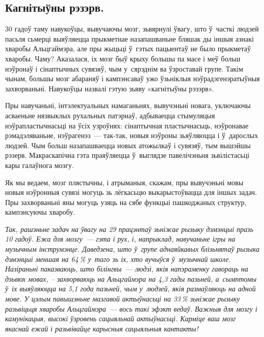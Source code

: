 \subsection*{Кагнітыўны рэзэрв.}

30 гадоў таму навукоўцы, вывучаючы мозг, зьвярнулі ўвагу, што ў~часткі людзей пасьля сьмерці выяўляецца прыкметнае назапашваньне бляшак ды іншыя азнакі хваробы Альцгаймэра, але пры жыцьці ў~гэтых пацыентаў не было прыкметаў хваробы. Чаму? Аказалася, іх мозг быў крыху большы па масе і меў больш нэўронаў і сінаптычных сувязяў, чым у~сярэднім ва ўзроставай групе. Такім чынам, большы мозг абараняў і кампэнсаваў ужо ўзьніклыя нэўрадэгенэратыўныя захворваньні. Навукоўцы назвалі гэтую зьяву «кагнітыўны рэзэрв».

Пры навучаньні, інтэлектуальных намаганьнях, вывучэньні новага, уключаючы асваеньне нязвыклых рухальных патэрнаў, адбываецца стымуляцыя нэўрапластычнасьці на ўсіх узроўнях: сінаптычная пластычнасьць, нэўронавае рэмадэляваньне, нэўрагенэз~--- так-так, новыя нэўроны зьяўляюцца і ў~дарослых людзей. Чым больш назапашваецца новых атожылкаў і сувязяў, тым вышэйшы рэзерв. Макраскапічна гэта праяўляецца ў~выглядзе павелічэньня зьвілістасьці кары галаўнога мозгу. 


Як мы ведаем, мозг плястычны, і атрыманыя, скажам, пры вывучэньні мовы новыя нэўронныя сувязі могуць зь лёгкасьцю выкарыстоўвацца для іншых задач. Пры захворваньні яны могуць узяць на сябе функцыі пашкоджаных структур, кампэнсуючы хваробу.


\emph{Так, рашэньне задач на ўвагу на 29 працэнтаў зьніжае рызыку дэмэнцыі празь 10 гадоў. Ежа для мозгу~--- гэта і рух, і, напрыклад, навучаньне ігры на музычным інструмэнце. Даведзена, што ў~групе аднаяйкавых блізьнятаў рызыка дэмэнцыі меншая на 64\,\% у~таго зь іх, хто вучыўся ў~музычнай школе. Назіраньні паказваюць, што білінгвы~--- людзі, якія напэраменку гавораць на дзьвюх мовах, -- захворваюць на Альцгаймэра на 4,3 гады пазьней, а~сымптомы ў~іх выяўляюцца на 5,1 года пазьней, чым у~людзей, якія размаўляюць на адной мове. У цэлым павышэньне мазгавой актыўнасьці на 33\,\% зьніжае рызыку разьвіцьця хваробы Альцгаймэра~--- вось такі эфэкт ведаў. Важныя для мозгу і камунікацыя, высокі ўзровень сацыяльнай актыўнасьці. Карміце ваш мозг якаснай ежай і разьвівайце карысныя сацыяльныя кантакты!}

